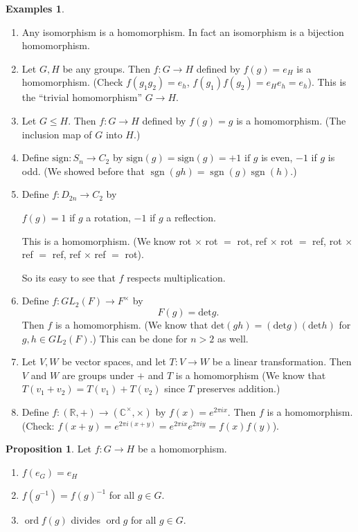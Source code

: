 \documentclass{article}
\theoremstyle{definition}
\newtheorem{proposition}{Proposition}
\newtheorem*{exmps}{Examples}
\DeclareMathOperator{\sgn}{sgn}
\DeclareMathOperator{\ord}{\text{ord}}
\begin{document}
\begin{exmps}\hfill
\begin{enumerate}
  \item Any isomorphism is a homomorphism. In fact an isomorphism is a bijection homomorphism.
  \item Let $G,H$ be any groups. Then
    $f : G \rightarrow H$ defined by $f(g) = e_H$ is a homomorphism. (Check $f(g_1 g_2)=e_h$, $f(g_1)f(g_2)=e_He_h = e_h$). This is the ``trivial homomorphism'' $G \rightarrow H.$
  \item Let $G \leq H$. Then $f:G\rightarrow H$ defined by $f(g)=g$ is a homomorphism. (The inclusion map of $G$ into $H$.)
  \item Define $\text{sign}:S_n \rightarrow C_2$ by $\text{sign}(g)=\text{sign}(g)=+1 \text{ if } g $ is even, $-1$ if $g$ is odd. (We showed before that $\sgn(gh)=\sgn(g)\sgn(h)$.)
  \item Define $f:D_{2n} \rightarrow C_2$ by 

    $f(g)=1$ if $g$ a rotation, $-1$ if $g$ a reflection.

    This is a homomorphism. (We know rot $\times$ rot $=$ rot, ref $\times$ rot $=$ ref, rot $\times$ ref $=$ ref, ref $\times$ ref $=$ rot).

    So its easy to see that $f$ respects multiplication.

  \item Define $f:GL_2(F) \rightarrow F^\times$ by
    $$F(g) = \text{det}g.$$ Then $f$ is a homomorphism. 
    (We know that $\text{det}(gh)=(\text{det}g)(\text{det}h)$ for $g,h \in GL_2(F)$.) This can be done for $n>2$ as well.
  \item Let $V,W$ be vector spaces, and let $T:V \rightarrow W$ be a linear transformation. Then $V$ and $W$ are groups under $+$ and $T$ is a homomorphism (We know that $T(v_1 + v_2)=T(v_1)+T(v_2)$ since $T$ preserves addition.) 
  \item Define $f: (\mathbb{R},+)\rightarrow (\mathbb{C}^\times,\times)$ by $f(x)=e^{2 \pi i x}.$ Then $f$ is a homomorphism. (Check: $f(x+y)=e^{2\pi i (x+y)}=e^{2\pi i x}e^{2 \pi i y}=f(x)f(y)$).\\
\end{enumerate}
  
\end{exmps}


\begin{proposition}
  Let $f: G \rightarrow H$ be a homomorphism. 
  \begin{enumerate}
    \item $f(e_G)=e_H$
    \item $f(g^{-1})=f(g)^{-1}$ for all $g \in G$.
    \item $\ord f(g)$ divides $\ord g$ for all $g \in G$.
  \end{enumerate}
\end{proposition}
\end{document}
